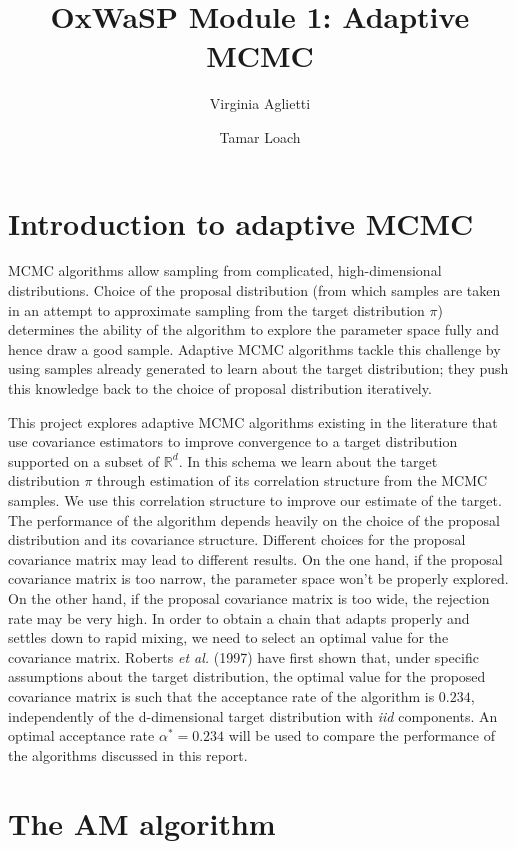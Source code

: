\documentclass{article}
\title{OxWaSP Module 1: Adaptive MCMC}
\author{Virginia Aglietti \and Tamar Loach}
\begin{document}
\maketitle

\section{Introduction to adaptive MCMC}

MCMC algorithms allow sampling from complicated, high-dimensional distributions. Choice of the proposal distribution (from which samples are taken in an attempt to approximate sampling from the target distribution $\pi$) determines the ability of the algorithm to explore the parameter space fully and hence draw a good sample. Adaptive MCMC algorithms tackle this challenge by using samples already generated to learn about the target distribution; they push this knowledge back to the choice of proposal distribution iteratively.

This project explores adaptive MCMC algorithms existing in the literature that use covariance estimators to improve convergence to a target distribution supported on a subset of $\mathbb{R}^d$. In this schema we learn about the target distribution $\pi$ through estimation of its correlation structure from the MCMC samples. We use this correlation structure to improve our estimate of the target. The performance of the algorithm depends heavily on the choice of the proposal distribution and its covariance structure. Different choices for the proposal covariance matrix may lead to different results. On the one hand, if the proposal covariance matrix is too narrow, the parameter space won't be properly explored. On the other hand, if the proposal covariance matrix is too wide, the rejection rate may be very high. In order to obtain a chain that adapts properly and settles down to rapid mixing, we need to select an optimal value for the covariance matrix.  Roberts \emph{et al.} (1997) have first shown that, under specific assumptions about the target distribution, the optimal value for the proposed covariance matrix is such that the acceptance rate of the algorithm is $0.234$, independently of the d-dimensional target distribution with \emph{iid} components. An optimal acceptance rate $\alpha^{*}=0.234$ will be used to compare the performance of the algorithms discussed in this report.

\section{The AM algorithm}
\end{document}
